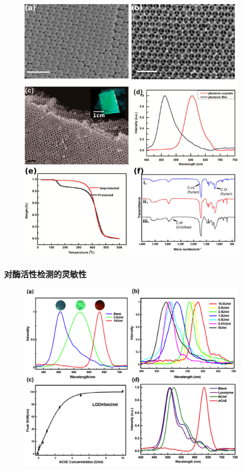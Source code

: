 \documentclass{beamer}
\begin{document}
\begin{frame}
\begin{minipage}{0.48\textwidth}
\begin{figure}[h]
      \includegraphics[width=\linewidth]{figures/material-maleimide.jpg}
    \end{figure}
  \end{minipage} 
\end{frame}


\begin{frame}
  \frametitle{对酶活性检测的灵敏性}
  \begin{figure}[t]
    \centering
    \includegraphics[height=0.60\linewidth]{figures/enzyme_sensitivity.png}
  \end{figure}
\end{frame}
\end{document}
